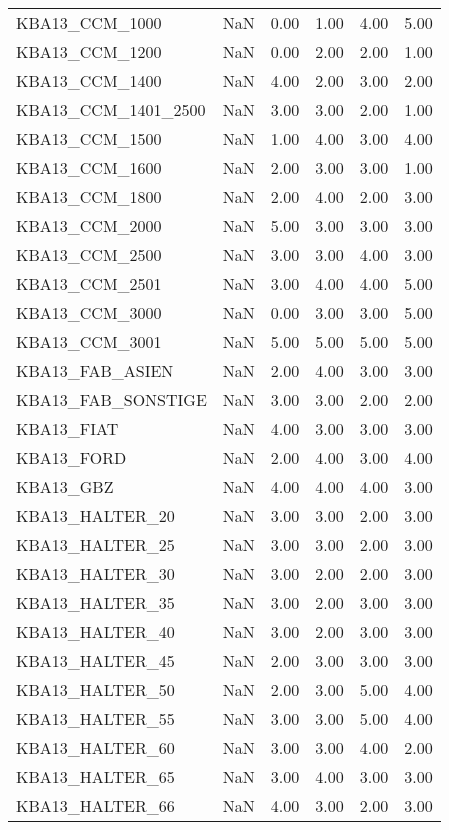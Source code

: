 \begin{longtable}{lp{1cm}p{1cm}p{1cm}p{1cm}p{1cm}}
KBA13\_CCM\_1000   & NaN & 0.00 & 1.00 & 4.00 & 5.00 \\
KBA13\_CCM\_1200   & NaN & 0.00 & 2.00 & 2.00 & 1.00 \\
KBA13\_CCM\_1400   & NaN & 4.00 & 2.00 & 3.00 & 2.00 \\
KBA13\_CCM\_1401\_2500  & NaN & 3.00 & 3.00 & 2.00 & 1.00 \\
KBA13\_CCM\_1500   & NaN & 1.00 & 4.00 & 3.00 & 4.00 \\
KBA13\_CCM\_1600   & NaN & 2.00 & 3.00 & 3.00 & 1.00 \\
KBA13\_CCM\_1800   & NaN & 2.00 & 4.00 & 2.00 & 3.00 \\
KBA13\_CCM\_2000   & NaN & 5.00 & 3.00 & 3.00 & 3.00 \\
KBA13\_CCM\_2500   & NaN & 3.00 & 3.00 & 4.00 & 3.00 \\
KBA13\_CCM\_2501   & NaN & 3.00 & 4.00 & 4.00 & 5.00 \\
KBA13\_CCM\_3000   & NaN & 0.00 & 3.00 & 3.00 & 5.00 \\
KBA13\_CCM\_3001   & NaN & 5.00 & 5.00 & 5.00 & 5.00 \\
KBA13\_FAB\_ASIEN  & NaN & 2.00 & 4.00 & 3.00 & 3.00 \\
KBA13\_FAB\_SONSTIGE & NaN & 3.00 & 3.00 & 2.00 & 2.00 \\
KBA13\_FIAT & NaN & 4.00 & 3.00 & 3.00 & 3.00 \\
KBA13\_FORD & NaN & 2.00 & 4.00 & 3.00 & 4.00 \\
KBA13\_GBZ & NaN & 4.00 & 4.00 & 4.00 & 3.00 \\
KBA13\_HALTER\_20  & NaN & 3.00 & 3.00 & 2.00 & 3.00 \\
KBA13\_HALTER\_25  & NaN & 3.00 & 3.00 & 2.00 & 3.00 \\
KBA13\_HALTER\_30  & NaN & 3.00 & 2.00 & 2.00 & 3.00 \\
KBA13\_HALTER\_35  & NaN & 3.00 & 2.00 & 3.00 & 3.00 \\
KBA13\_HALTER\_40  & NaN & 3.00 & 2.00 & 3.00 & 3.00 \\
KBA13\_HALTER\_45  & NaN & 2.00 & 3.00 & 3.00 & 3.00 \\
KBA13\_HALTER\_50  & NaN & 2.00 & 3.00 & 5.00 & 4.00 \\
KBA13\_HALTER\_55  & NaN & 3.00 & 3.00 & 5.00 & 4.00 \\
KBA13\_HALTER\_60  & NaN & 3.00 & 3.00 & 4.00 & 2.00 \\
KBA13\_HALTER\_65  & NaN & 3.00 & 4.00 & 3.00 & 3.00 \\
KBA13\_HALTER\_66  & NaN & 4.00 & 3.00 & 2.00 & 3.00 \\

\end{longtable}
